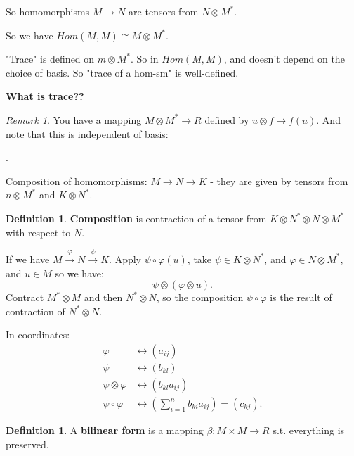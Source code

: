 \documentclass[12pt]{amsbook}
\theoremstyle{plain}
\numberwithin{section}{chapter}
\numberwithin{equation}{chapter}
\theoremstyle{definition}
\newtheorem{Def}[theorem]{Definition}
\theoremstyle{remark}
\newtheorem{rem}[theorem]{Remark}
\newcommand{\bb}{\vspace{3mm}}
\newcommand{\bee}{\begin{equation}\begin{aligned}}
\newcommand{\eee}{\end{aligned}\end{equation}}
\newcommand{\tens}{\otimes}
\newcommand{\lpar}{\left(}
\newcommand{\rpar}{\right)}
\renewcommand{\phi}{\varphi}
\begin{document}
So homomorphisms $M \to N$ are tensors from $N \tens M^*$. 

So we have $Hom(M,M) \cong M \tens M^*$. 

"Trace" is defined on $m \tens M^*$. So in $Hom(M,M)$, and doesn't depend on the choice of basis. So "trace of a hom-sm" is well-defined. 

\textbf{What is trace??}

\begin{rem}
You have a mapping $M \tens M^* \to R$ defined by $u \tens f \mapsto f(u)$. And note that this is independent of basis:
\begin{center}
.
\end{center}
\end{rem}

Composition of homomorphisms: $M \to N \to K$ - they are given by tensors from $n \tens M^*$ and $K \tens N^*$. 

\begin{Def}
\textbf{Composition} is contraction of a tensor from $K \tens N^* \tens N \tens M^*$ with respect to $N$. 
\end{Def}

If we have $M \overset{\phi}{\to}N \overset{\psi}{\to}K$. Apply $\psi \circ \phi(u)$, take $\psi \in K \tens N^*$, and $\phi \in N \tens M^*$, and $u \in M$ so we have:
$$
\psi \tens (\phi \tens u).
$$
Contract $M^* \tens M$ and then $N^* \tens N$, so the composition $\psi \circ \phi$ is the result of contraction of $N^* \tens N$. 

In coordinates: 
\bee 
\phi &\leftrightarrow (a_{ij})\\
\psi &\leftrightarrow (b_{kl})\\
\psi \tens \phi &\leftrightarrow (b_{kl}a_{ij})\\
\psi \circ \phi &\leftrightarrow \lpar \sum_{i = 1}^nb_{ki}a_{ij} \rpar  = (c_{kj}).
\eee


\bb\bb\bb

\begin{Def}
A \textbf{bilinear form} is a mapping $\beta:M \times M \to R$ s.t. everything is preserved. 
\end{Def}
\end{document}
